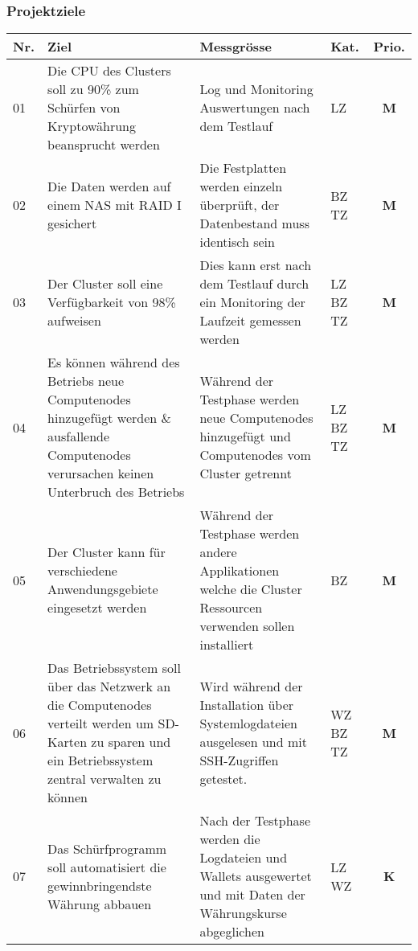 \newpage
\subsubsection{Projektziele} 
\label{sec:Projektziele}

\begin{table}[H]
\begin{tabular}[t]{p{0.7cm}|p{6.1cm}p{6.1cm} >{\centering}p{0.6cm}c}
\hline
\rowcolor{heading}\textbf{Nr.} & \textbf{Ziel} & \textbf{Messgrösse} & \textbf{Kat.} & \textbf{Prio.} \\\hline
01 & Die CPU des Clusters soll zu 90\% zum Schürfen von Kryptowährung  beansprucht werden & Log und Monitoring Auswertungen nach dem Testlauf & LZ & \textbf{M} \\\hline
02 & Die Daten werden auf einem NAS mit RAID I gesichert & Die Festplatten werden einzeln überprüft, der Datenbestand muss identisch sein & BZ \newline TZ & \textbf{M} \\\hline
03 & Der Cluster soll eine Verfügbarkeit von 98\% aufweisen & Dies kann erst nach dem Testlauf durch ein Monitoring der Laufzeit gemessen werden & LZ \newline BZ \newline TZ & \textbf{M} \\\hline
04 & Es können während des Betriebs neue Computenodes hinzugefügt werden \& ausfallende Computenodes verursachen keinen Unterbruch des Betriebs & Während der Testphase werden neue Computenodes hinzugefügt und Computenodes vom Cluster getrennt  & LZ \newline BZ \newline TZ & \textbf{M} \\\hline 
05 & Der Cluster kann für verschiedene Anwendungsgebiete eingesetzt werden & Während der Testphase werden andere Applikationen welche die Cluster Ressourcen verwenden sollen installiert & BZ & \textbf{M} \\\hline
06 & Das Betriebssystem soll über das Netzwerk an die Computenodes verteilt werden um SD-Karten zu sparen und ein Betriebssystem zentral verwalten zu können & Wird während der Installation über Systemlogdateien ausgelesen und mit SSH-Zugriffen getestet. & WZ \newline BZ \newline TZ & \textbf{M} \\\hline
07 & Das Schürfprogramm soll automatisiert die gewinnbringendste Währung abbauen & Nach der Testphase werden die Logdateien und Wallets ausgewertet und mit Daten der Währungskurse abgeglichen & LZ \newline WZ & \textbf{K} \\\hline

\end{tabular}
\end{table}
